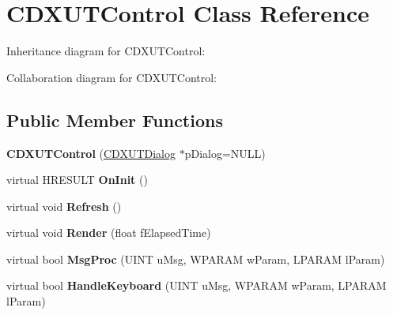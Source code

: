 \hypertarget{class_c_d_x_u_t_control}{\section{C\+D\+X\+U\+T\+Control Class Reference}
\label{class_c_d_x_u_t_control}
}


Inheritance diagram for C\+D\+X\+U\+T\+Control\+:


Collaboration diagram for C\+D\+X\+U\+T\+Control\+:
\subsection*{Public Member Functions}
\begin{DoxyCompactItemize}
\item 
\hypertarget{class_c_d_x_u_t_control_abbc50ddb4a91fe52f122787637efc715}{{\bfseries C\+D\+X\+U\+T\+Control} (\hyperlink{class_c_d_x_u_t_dialog}{C\+D\+X\+U\+T\+Dialog} $\ast$p\+Dialog=N\+U\+L\+L)}\label{class_c_d_x_u_t_control_abbc50ddb4a91fe52f122787637efc715}

\item 
\hypertarget{class_c_d_x_u_t_control_a8f1418d201b97e0a9dc83a0e25207eca}{virtual H\+R\+E\+S\+U\+L\+T {\bfseries On\+Init} ()}\label{class_c_d_x_u_t_control_a8f1418d201b97e0a9dc83a0e25207eca}

\item 
\hypertarget{class_c_d_x_u_t_control_a6d81df6b2d6739e44b4b4aee9ab156b1}{virtual void {\bfseries Refresh} ()}\label{class_c_d_x_u_t_control_a6d81df6b2d6739e44b4b4aee9ab156b1}

\item 
\hypertarget{class_c_d_x_u_t_control_ad47534d221695e212e5b5c32d867a164}{virtual void {\bfseries Render} (float f\+Elapsed\+Time)}\label{class_c_d_x_u_t_control_ad47534d221695e212e5b5c32d867a164}

\item 
\hypertarget{class_c_d_x_u_t_control_a58d0d118146c8853a7ccd27da9e3fcf3}{virtual bool {\bfseries Msg\+Proc} (U\+I\+N\+T u\+Msg, W\+P\+A\+R\+A\+M w\+Param, L\+P\+A\+R\+A\+M l\+Param)}\label{class_c_d_x_u_t_control_a58d0d118146c8853a7ccd27da9e3fcf3}

\item 
\hypertarget{class_c_d_x_u_t_control_a94044e608adeac7c329d83cf63587dcf}{virtual bool {\bfseries Handle\+Keyboard} (U\+I\+N\+T u\+Msg, W\+P\+A\+R\+A\+M w\+Param, L\+P\+A\+R\+A\+M l\+Param)}\label{class_c_d_x_u_t_control_a94044e608adeac7c329d83cf63587dcf}


\end{DoxyCompactItemize}
